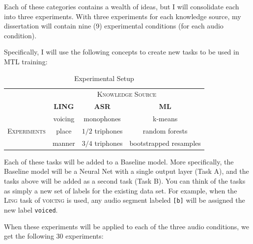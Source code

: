 \documentclass[10pt,a4paper]{article}
\begin{document}
Each of these categories contains a wealth of ideas, but I will consolidate each into three experiments. With three experiments for each knowledge source, my dissertation will contain nine (9) experimental conditions (for each audio condition).

Specifically, I will use the following concepts to create new tasks to be used in MTL training:

\begin{table}[htbp]
  \centering
  \begin{adjustbox}{width=.75\textwidth}
    \begin{tabular}{cccc}
      \toprule
      & \multicolumn{3}{c}{\textsc{Knowledge Source}}\\
      & \textbf{LING} & \textbf{ASR} & \textbf{ML}\\
      \midrule
      \multirow{3}{*}{\textsc{Experiments}} & voicing & monophones &  k-means \\
      & place & $1/2$ triphones & random forests  \\
      & manner & $3/4$ triphones &  bootstrapped resamples  \\
      \bottomrule
    \end{tabular}
    \label{table:data}
  \end{adjustbox}
  
  \caption{Experimental Setup}
  
\end{table}


Each of these tasks will be added to a Baseline model. More specifically, the Baseline model will be a Neural Net with a single output layer (Task A), and the tasks above will be added as a second task (Task B). You can think of the tasks as simply a new set of labels for the existing data set. For example, when the \textsc{Ling} task of \textsc{voicing} is used, any audio segment labeled \texttt{[b]} will be assigned the new label \texttt{voiced}.

When these experiments will be applied to each of the three audio conditions, we get the following 30 experiments:
\end{document}
